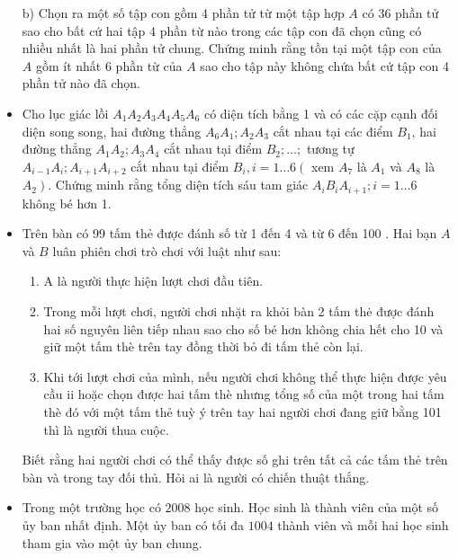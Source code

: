 \documentclass[11pt]{scrartcl}
\begin{document}
\begin{itemize}[label=, leftmargin=0em, itemsep=0.5em]
\begin{btvn}
        b) Chọn ra một số tập con gồm 4 phần tử từ một tập hợp $A$ có 36 phần tử sao cho bất cứ hai tập 4 phần từ nào trong các tập con đã chọn cũng có nhiều nhất là hai phần tử chung. Chứng minh rằng tồn tại một tập con của $A$ gồm ít nhất 6 phần từ của $A$ sao cho tập này không chứa bất cứ tập con 4 phần tử nào đã chọn.
    \end{btvn}
    \item \begin{btvn}
        Cho lục giác lồi $A_1 A_2 A_3 A_4 A_5 A_6$ có diện tích bằng 1 và có các cặp cạnh đối diện song song, hai đường thẳng $A_6 A_1 ; A_2 A_3$ cắt nhau tại các điểm $B_1$, hai đường thẳng $A_1 A_2 ; A_3 A_4$ cắt nhau tại điểm $B_2 ; \ldots ;$ tương tự $A_{i-1} A_i ; A_{i+1} A_{i+2}$ cắt nhau tại điểm $B_i, i=1 \ldots 6\left(\right.$ xem $A_7$ là $A_1$ và $A_8$ là $\left.A_2\right)$. Chứng minh rằng tổng diện tích sáu tam giác $A_i B_i A_{i+1} ; i=1 \ldots 6$ không bé hơn 1.
    \end{btvn}
    \item \begin{btvn}
        Trên bàn có 99 tấm thẻ được đánh số từ 1 đến 4 và từ 6 đến 100 . Hai bạn $A$ và $B$ luân phiên chơi trò chơi với luật như sau:
        \begin{enumerate}
            \item A là người thực hiện lượt chơi đầu tiên.
            \item Trong mỗi lượt chơi, người chơi nhặt ra khỏi bàn 2 tấm thė được đánh hai số nguyên liên tiếp nhau sao cho số bé hơn không chia hết cho 10 và giữ một tấm thè trên tay đồng thời bỏ đi tấm thẻ còn lại.
            \item Khi tới lượt chơi của mình, nếu người chơi không thể thực hiện được yêu cầu ii hoặc chọn được hai tấm thè nhưng tổng số của một trong hai tấm thè đó với một tấm thẻ tuỳ ý trên tay hai người chơi đang giữ bằng 101 thì là người thua cuộc.
        \end{enumerate}
        Biết rằng hai người chơi có thể thấy được số ghi trên tất cả các tấm thẻ trên bàn và trong tay đối thủ. Hỏi ai là người có chiến thuật thắng.
    \end{btvn}
    \item \begin{btvn}
        Trong một trường học có $2008$ học sinh. Học sinh là thành viên của một số ủy ban nhất định. Một ủy ban có tối đa $1004$ thành viên và mỗi hai học sinh tham gia vào một ủy ban chung.

\end{btvn}
\end{itemize}
\end{document}
